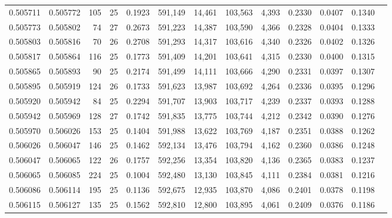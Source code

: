 \begin{tabular}{rrrrrrrrrrrrr}
0.505711 & 0.505772 & 105 &  25 &                                     0.1923 & 591,149 &  14,461 & 103,563 &   4,393 & 0.2330 & 0.0407 & 0.1340 \\
0.505773 & 0.505802 &  74 &  27 &                                     0.2673 & 591,223 &  14,387 & 103,590 &   4,366 & 0.2328 & 0.0404 & 0.1333 \\
0.505803 & 0.505816 &  70 &  26 &                                     0.2708 & 591,293 &  14,317 & 103,616 &   4,340 & 0.2326 & 0.0402 & 0.1326 \\
0.505817 & 0.505864 & 116 &  25 &                                     0.1773 & 591,409 &  14,201 & 103,641 &   4,315 & 0.2330 & 0.0400 & 0.1315 \\
0.505865 & 0.505893 &  90 &  25 &                                     0.2174 & 591,499 &  14,111 & 103,666 &   4,290 & 0.2331 & 0.0397 & 0.1307 \\
0.505895 & 0.505919 & 124 &  26 &                                     0.1733 & 591,623 &  13,987 & 103,692 &   4,264 & 0.2336 & 0.0395 & 0.1296 \\
0.505920 & 0.505942 &  84 &  25 &                                     0.2294 & 591,707 &  13,903 & 103,717 &   4,239 & 0.2337 & 0.0393 & 0.1288 \\
0.505942 & 0.505969 & 128 &  27 &                                     0.1742 & 591,835 &  13,775 & 103,744 &   4,212 & 0.2342 & 0.0390 & 0.1276 \\
0.505970 & 0.506026 & 153 &  25 &                                     0.1404 & 591,988 &  13,622 & 103,769 &   4,187 & 0.2351 & 0.0388 & 0.1262 \\
0.506026 & 0.506047 & 146 &  25 &                                     0.1462 & 592,134 &  13,476 & 103,794 &   4,162 & 0.2360 & 0.0386 & 0.1248 \\
0.506047 & 0.506065 & 122 &  26 &                                     0.1757 & 592,256 &  13,354 & 103,820 &   4,136 & 0.2365 & 0.0383 & 0.1237 \\
0.506065 & 0.506085 & 224 &  25 &                                     0.1004 & 592,480 &  13,130 & 103,845 &   4,111 & 0.2384 & 0.0381 & 0.1216 \\
0.506086 & 0.506114 & 195 &  25 &                                     0.1136 & 592,675 &  12,935 & 103,870 &   4,086 & 0.2401 & 0.0378 & 0.1198 \\
0.506115 & 0.506127 & 135 &  25 &                                     0.1562 & 592,810 &  12,800 & 103,895 &   4,061 & 0.2409 & 0.0376 & 0.1186 \\

\end{tabular}

